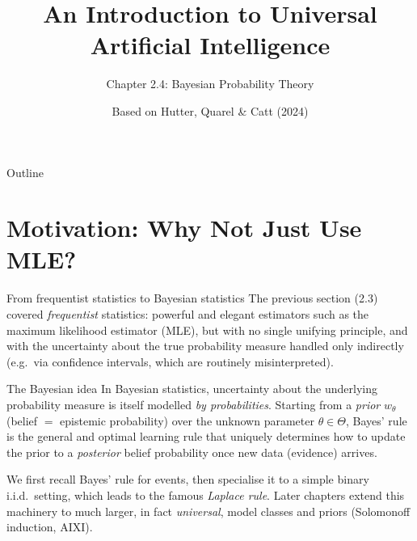 \documentclass[aspectratio=169,10pt]{beamer}
\title[UAI -- Ch.2.4]{An Introduction to Universal Artificial Intelligence}
\subtitle{Chapter 2.4: Bayesian Probability Theory}
\author{Based on Hutter, Quarel \& Catt (2024)}
\date{}
\begin{document}
\begin{frame}
  \titlepage
\end{frame}

\begin{frame}{Outline}
  \tableofcontents
\end{frame}

\section{Motivation: Why Not Just Use MLE?}

\begin{frame}{From frequentist statistics to Bayesian statistics}
  The previous section (2.3) covered \emph{frequentist} statistics: powerful
  and elegant estimators such as the maximum likelihood estimator (MLE), but
  with no single unifying principle, and with the uncertainty about the true
  probability measure handled only indirectly (e.g.\ via confidence
  intervals, which are routinely misinterpreted).

  \begin{block}{The Bayesian idea}
    In Bayesian statistics, uncertainty about the underlying probability
    measure is itself modelled \emph{by probabilities}. Starting from a
    \emph{prior} $w_\theta$ (belief $=$ epistemic probability) over the
    unknown parameter $\theta\in\Theta$, Bayes' rule is the general and
    optimal learning rule that uniquely determines how to update the prior to
    a \emph{posterior} belief probability once new data (evidence) arrives.
  \end{block}

  We first recall Bayes' rule for events, then specialise it to a simple
  binary i.i.d.\ setting, which leads to the famous \emph{Laplace rule}.
  Later chapters extend this machinery to much larger, in fact
  \emph{universal}, model classes and priors (Solomonoff induction, AIXI).
\end{frame}
\end{document}
